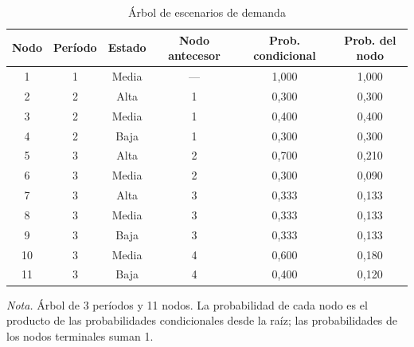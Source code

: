 \begin{table}[H]
  \centering
  \caption{Árbol de escenarios de demanda}
  \label{tab:anexoA-arbol-escenarios}

  \begin{tabular*}{\textwidth}{@{\extracolsep{\fill}}cccccc}
    \toprule
    \textbf{Nodo} & \textbf{Período} & \textbf{Estado} & \textbf{Nodo antecesor} & \textbf{Prob. condicional} & \textbf{Prob. del nodo} \\
    \midrule
    1  & 1 & Media & — & 1,000 & 1,000 \\
    2  & 2 & Alta  & 1 & 0,300 & 0,300 \\
    3  & 2 & Media & 1 & 0,400 & 0,400 \\
    4  & 2 & Baja  & 1 & 0,300 & 0,300 \\
    5  & 3 & Alta  & 2 & 0,700 & 0,210 \\
    6  & 3 & Media & 2 & 0,300 & 0,090 \\
    7  & 3 & Alta  & 3 & 0,333 & 0,133 \\
    8  & 3 & Media & 3 & 0,333 & 0,133 \\
    9  & 3 & Baja  & 3 & 0,333 & 0,133 \\
    10 & 3 & Media & 4 & 0,600 & 0,180 \\
    11 & 3 & Baja  & 4 & 0,400 & 0,120 \\
    \bottomrule
  \end{tabular*}

  \vspace{0.6em}
  \raggedright \small \textit{Nota.} Árbol de 3 períodos y 11 nodos. La probabilidad de cada nodo es el producto de las probabilidades condicionales desde la raíz; las probabilidades de los nodos terminales suman 1.
\end{table}


